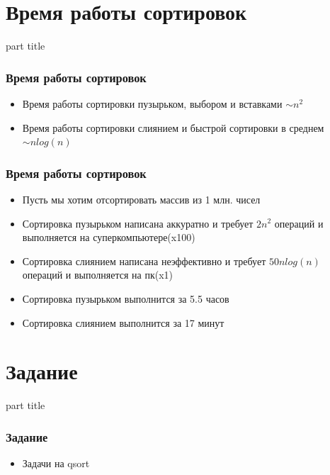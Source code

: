 \documentclass[14pt,pdf,hyperref={unicode}]{beamer}
\begin{document}
\section{Время работы сортировок}
\begin{frame}
\begin{center}
\begin{beamercolorbox}[sep=8pt,center]{part
title}
\insertsection
\end{beamercolorbox}
\end{center}
\end{frame}

\begin{frame}[fragile]
\frametitle{Время работы сортировок} 
\begin{itemize}
\item Время работы сортировки пузырьком, выбором и вставками $\sim n^2$ \\
\item Время работы сортировки слиянием и быстрой сортировки в среднем $\sim n log(n)$ \\
\end{itemize}
\end{frame}

\begin{frame}[fragile]
\frametitle{Время работы сортировок} 
\begin{itemize}
\item Пусть мы хотим отсортировать массив из 1 млн. чисел
\item Сортировка пузырьком написана аккуратно и требует $2n^2$ операций и выполняется на суперкомпьютере(x100)
\item Сортировка слиянием написана неэффективно и требует $50 n log(n)$ операций и выполняется на пк(x1)
\item Сортировка пузырьком выполнится за 5.5 часов \\
\item Сортировка слиянием выполнится за 17 минут \\
\end{itemize}
\end{frame}





\section{Задание}
\begin{frame}
\begin{center}
\begin{beamercolorbox}[sep=8pt,center]{part
title}
\insertsection
\end{beamercolorbox}
\end{center}
\end{frame}

\begin{frame}[fragile]
\frametitle{Задание} 
\begin{itemize}
\item Задачи на qsort
\end{itemize}
\end{frame}
\end{document}
